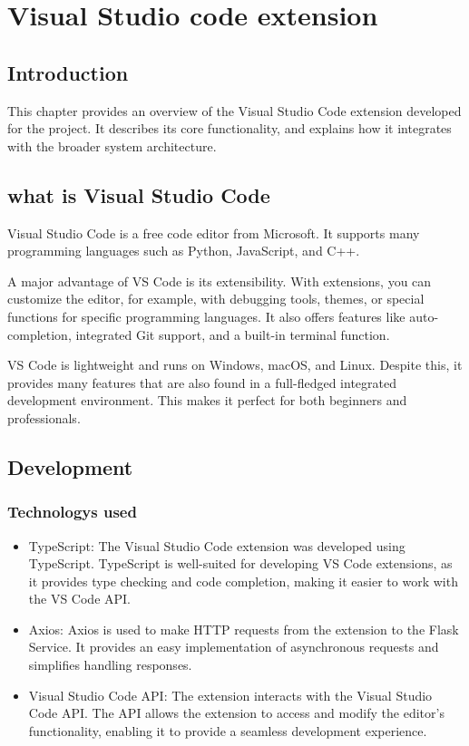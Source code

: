 \chapter{Visual Studio code extension}
\label{chap:VS_code_extension}

\section{Introduction}

This chapter provides an overview of the Visual Studio Code extension developed for the project. It describes its core functionality, and explains how it integrates with the broader system architecture.

\section{what is Visual Studio Code}

Visual Studio Code is a free code editor from Microsoft. It supports many programming languages such as Python, JavaScript, and C++.

A major advantage of VS Code is its extensibility. With extensions, you can customize the editor, for example, with debugging tools, themes, or special functions for specific programming languages. It also offers features like auto-completion, integrated Git support, and a built-in terminal function.

VS Code is lightweight and runs on Windows, macOS, and Linux. Despite this, it provides many features that are also found in a full-fledged integrated development environment. This makes it perfect for both beginners and professionals.

\section{Development}

\subsection{Technologys used}

\begin{itemize}
    \item TypeScript: The Visual Studio Code extension was developed using TypeScript. TypeScript is well-suited for developing VS Code extensions, as it provides type checking and code completion, making it easier to work with the VS Code API.
    \item Axios: Axios is used to make HTTP requests from the extension to the Flask Service. It provides an easy implementation of asynchronous requests and simplifies handling responses.
    \item Visual Studio Code API: The extension interacts with the Visual Studio Code API. The API allows the extension to access and modify the editor's functionality, enabling it to provide a seamless development experience.
\end{itemize}


